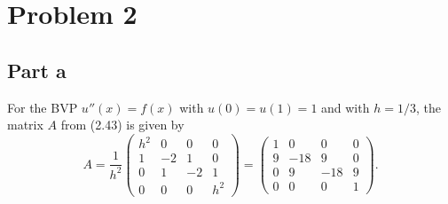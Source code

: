 \documentclass{article}
\begin{document}
\section{Problem 2}
\subsection{Part a}
For the BVP $u''(x)=f(x)$ with $u(0)=u(1)=1$ and with $h = 1/3$, the matrix $A$ from (2.43) is given by 
\[
A=\frac{1}{h^2}\begin{pmatrix}
h^2&0&0&0\\
1&-2&1&0\\
0&1&-2&1\\
0&0&0&h^2\end{pmatrix}=\begin{pmatrix}
1&0&0&0\\
9&-18&9&0\\
0&9&-18&9\\
0&0&0&1\end{pmatrix}.
\]
\end{document}
